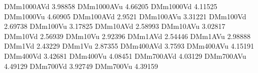 DMm1000AVd 3.98858
DMm1000AVu 4.66205
DMm1000Vd 4.11525
DMm1000Vu 4.60905
DMm100AVd 2.9521
DMm100AVu 3.31221
DMm100Vd 2.69738
DMm100Vu 3.17825
DMm10AVd 2.58993
DMm10AVu 3.02817
DMm10Vd 2.56939
DMm10Vu 2.92396
DMm1AVd 2.54446
DMm1AVu 2.98888
DMm1Vd 2.43229
DMm1Vu 2.87355
DMm400AVd 3.7593
DMm400AVu 4.15191
DMm400Vd 3.42681
DMm400Vu 4.08451
DMm700AVd 4.03129
DMm700AVu 4.49129
DMm700Vd 3.92749
DMm700Vu 4.39159
